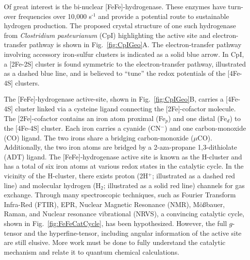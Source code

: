 Of great interest is the bi-nuclear [FeFe]-hydrogenase. \cite{PETERS20151350} These enzymes have turn-over frequencies over 10,000 s$^{\text{-1}}$\cite{CatalyticTOF} and provide a potential route to sustainable hydrogen production. The proposed crystal structure of one such hydrogenase from \textit{Clostridium pasteurianum} (CpI) highlighting the active site and electron-transfer pathway is shown in Fig.~\ref{fig:CpIGeo}A. \cite{FeFeCry} The electron-transfer pathway involving accessory iron-sulfur clusters is indicated as a solid blue arrow. In CpI, a [2Fe-2S] cluster is found symmetric to the electron-transfer pathway, illustrated as a dashed blue line, and is believed to ``tune'' the redox potentials of the [4Fe-4S] clusters. \cite{PetersPotentials} 

The [FeFe]-hydrogenase active-site, shown in Fig.~\ref{fig:CpIGeo}B, carries a [4Fe-4S] cluster linked via a cysteine ligand connecting the [2Fe]-cofactor molecule. The [2Fe]-cofactor contains an iron atom proximal (Fe$_p$) and one distal (Fe$_d$) to the [4Fe-4S] cluster. Each iron carries a cyanide (CN$^-$) and one carbon-monoxide (CO) ligand. The two irons share a bridging carbon-monoxide ($\mu$CO). Additionally, the two iron atoms are bridged by a 2-aza-propane 1,3-dithiolate (ADT) ligand. The [FeFe]-hydrogenase active site is known as the H-cluster and has a total of six iron atoms at various redox states in the catalytic cycle. In the vicinity of the H-cluster, there exists proton (2H$^+$; illustrated as a dashed red line) and molecular hydrogen (H$_2$; illustrated as a solid red line) channels for gas exchange. Through many spectroscopic techniques, such as Fourier Transform Infra-Red (FTIR), EPR, Nuclear Magnetic Resonance (NMR), M\"o\ss{}bauer, Raman, and Nuclear resonance vibrational (NRVS), a convincing catalytic cycle, shown in Fig.~\ref{fig:FeFeCatCycle}, has been hypothesized. \cite{lubitzhyd,NRVS2017,sommer2017} However, the full $g$-tensor and the hyperfine-tensor, including angular information of the active site are still elusive. More work must be done to fully understand the catalytic mechanism and relate it to quantum chemical calculations. 

